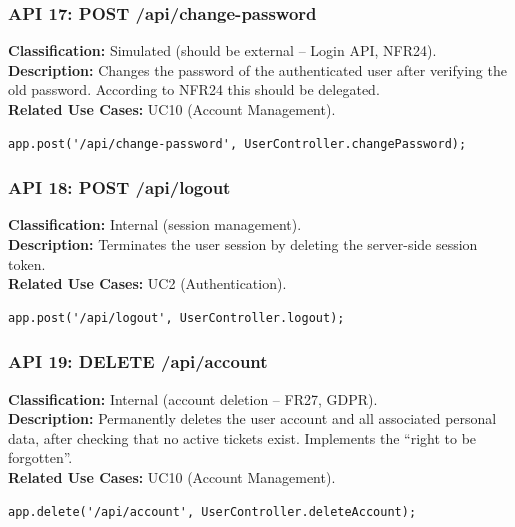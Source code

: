\documentclass{article}
\begin{document}
\subsubsection*{API 17: POST /api/change-password}
\textbf{Classification:} Simulated (should be external – Login API, NFR24).\\
\textbf{Description:} Changes the password of the authenticated user after
verifying the old password. According to NFR24 this should be delegated.\\
\textbf{Related Use Cases:} UC10 (Account Management).
\begin{verbatim}
app.post('/api/change-password', UserController.changePassword);
\end{verbatim}

\subsubsection*{API 18: POST /api/logout}
\textbf{Classification:} Internal (session management).\\
\textbf{Description:} Terminates the user session by deleting the server-side
session token.\\
\textbf{Related Use Cases:} UC2 (Authentication).
\begin{verbatim}
app.post('/api/logout', UserController.logout);
\end{verbatim}

\subsubsection*{API 19: DELETE /api/account}
\textbf{Classification:} Internal (account deletion – FR27, GDPR).\\
\textbf{Description:} Permanently deletes the user account and all associated
personal data, after checking that no active tickets exist. Implements the
“right to be forgotten”.\\
\textbf{Related Use Cases:} UC10 (Account Management).
\begin{verbatim}
app.delete('/api/account', UserController.deleteAccount);
\end{verbatim}

\end{document}

